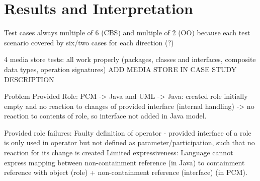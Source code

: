



\section{Results and Interpretation}

Test cases always multiple of 6 (CBS) and multiple of 2 (OO) because each test scenario covered by six/two cases for each direction (?)

4 media store tests: all work properly (packages, classes and interfaces, composite data types, operation signatures)
ADD MEDIA STORE IN CASE STUDY DESCRIPTION

Problem Provided Role: PCM -> Java and UML -> Java: created role initially empty and no reaction to changes of provided interface (internal handling) -> no reaction to contents of role, so interface not added in Java model.

Provided role failures: Faulty definition of operator - provided interface of a role is only used in operator but not defined as parameter/participation, such that no reaction for its change is created
Limited expressiveness: Language cannot express mapping between non-containment reference (in Java) to containment reference with object (role) + non-containment reference (interface) (in PCM).



